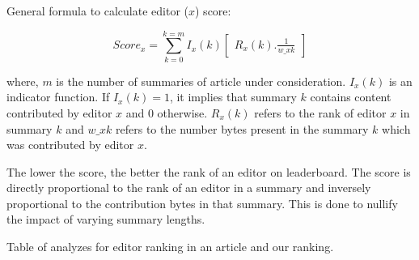 \documentclass[12pt]{article}
\begin{document}
General formula to calculate editor ($x$) score:

\begin{equation}
	Score_x = \sum_{k=0}^{k=m}I_x(k)\begin{bmatrix}R_x(k).\frac{1}{w\_xk}\end{bmatrix}
\end{equation}

    where, $m$ is the number of summaries of article under consideration. $I_x(k)$ is an indicator function. 
If $I_x(k)=1$, it implies that summary $k$ contains content contributed by editor $x$ and 0 otherwise.
$R_x(k)$ refers to the rank of editor $x$ in summary $k$ and $w\_xk$ refers to the number bytes present in the summary $k$ which was contributed by editor $x$.

The lower the score, the better the rank of an editor on leaderboard. The score is directly proportional to the rank of an editor in a summary and inversely proportional to the contribution bytes in that summary. This is done to nullify the impact of varying summary lengths.



Table of analyzes for editor ranking in an article and our ranking.
\end{document}
